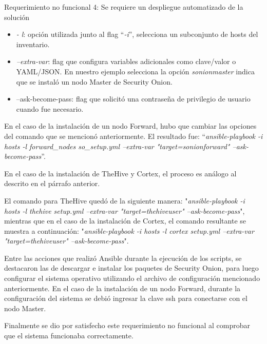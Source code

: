 \begin{section}{Requerimiento no funcional 4: Se requiere un despliegue automatizado de la solución}
\begin{itemize}
        \item \textit{- l}: opción utilizada junto al flag “\textit{-i}”, selecciona un subconjunto de hosts del inventario.
        \item \textit{--extra-var}: flag que configura variables adicionales como clave/valor o YAML/JSON. En nuestro ejemplo selecciona la opción \textit{sonionmaster} indica que se instaló un nodo Master de Security Onion.
        \item --ask-become-pass: flag que solicitó una contraseña de privilegio de usuario cuando fue necesario.
    \end{itemize}
    En el caso de la instalación de un nodo Forward, hubo que cambiar las opciones del  comando que se mencionó anteriormente. El resultado fue: “\textit{ansible-playbook -i hosts -l forward\_nodes so\_setup.yml --extra-var "target=sonionforward"\hspace{1 mm} --ask-become-pass}”. \par
    En el caso de la instalación de TheHive y Cortex, el proceso es análogo al descrito en el párrafo anterior.\par
    El comando para TheHive quedó de la siguiente manera: "\textit{ansible-playbook -i hosts -l thehive setup.yml --extra-var "target=thehiveuser"\hspace{1 mm}  --ask-become-pass}", mientras que en el caso de la instalación de Cortex, el comando resultante se muestra a continuación:
    "\textit{ansible-playbook -i hosts -l cortex setup.yml --extra-var "target=thehiveuser"\hspace{1 mm} --ask-become-pass}".\par
    Entre las acciones que realizó Ansible durante la ejecución de los scripts, se destacaron las de descargar e instalar los paquetes de Security Onion, para luego configurar el sistema operativo utilizando el archivo de configuración mencionado anteriormente. En el caso de la instalación de un nodo Forward, durante la configuración del sistema se debió ingresar la clave ssh para conectarse con el nodo Master.\par
    Finalmente se dio por satisfecho este requerimiento no funcional al comprobar que el sistema funcionaba correctamente.\par

    

    \end{section}